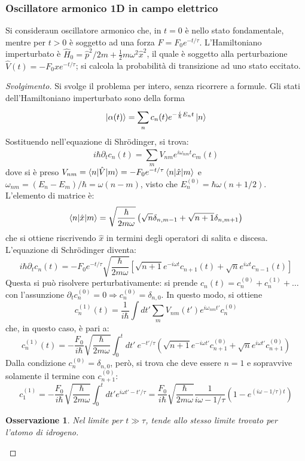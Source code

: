 \documentclass[11pt, a4paper]{scrartcl} %
\numberwithin{equation}{subsection}
\theoremstyle{style2}
\newtheorem{osservazione}{Osservazione}[section]
\theoremstyle{style1}
\renewcommand\qedsymbol{$\blacksquare$}
\newenvironment{svolgimento}{\renewcommand\qedsymbol{$\spadesuit$}\begin{proof}[Svolgimento]}{\end{proof}}
\begin{document}
\subsubsection{Oscillatore armonico 1D in campo elettrico}
Si consideraun oscillatore armonico che, in $t=0$ \`e nello stato fondamentale, mentre per $t > 0$ \`e soggetto ad una forza $F = F_0 e^{- t / \tau } $.
L'Hamiltoniano imperturbato \`e $\hat{H}_0 = \hat{p}^2 / 2m + \frac{1}{2}m \omega^2 \hat{x}^2$, il quale \`e soggetto alla perturbazione $\hat{V}(t) = - F_0 x e^{- t / \tau } $; si calcola la probabilit\`a di transizione ad uno stato eccitato.
\begin{svolgimento}
	Si svolge il problema per intero, senza ricorrere a formule.
	Gli stati dell'Hamiltoniano imperturbato sono della forma
	\[
	\ket{\alpha (t)} = \sum_{n}^{} c_n(t) e^{-\frac{i}{\hbar }E_n t} \ket{n} 
	\] 
	Sostituendo nell'equazione di Shr\"odinger, si trova:
	\[
	i \hbar \partial _t c_n(t) = \sum_{m}^{} V_{nm} e^{i \omega_{nm} t} c_m (t) 
	\] 
	dove si \`e preso $V_{nm} = \braket{n|\hat{V}|m} = - F_0 e^{- t / \tau } \braket{n|\hat{x}|m} $ e $\omega_{nm} = (E_n -E_m) / \hbar =\omega(n-m)$, visto che $E_n^{(0)} = \hbar \omega ( n + 1 /2)$.
L'elemento di matrice \`e:
\[
 \braket{n|\hat{x}|m} = \sqrt{\frac{\hbar }{2m\omega}} \left(\sqrt{n} \delta _{n,m-1} + \sqrt{n+1} \delta _{n,m+1} \right) 
\] 
che si ottiene riscrivendo $\hat{x} $ in termini degli operatori di salita e discesa.
L'equazione di Schr\"odinger diventa:
\begin{equation}
i \hbar  \partial _t c_n(t) = - F_0 e^{- t / \tau }  \sqrt{\frac{\hbar }{2m\omega}} \left[ \sqrt{n+1} e^{-i\omega t} c_{n+1} (t) + \sqrt{n} e^{i\omega t} c_{n-1} (t) \right] 
\end{equation}
Questa si pu\`o risolvere perturbativamente: si prende $c_n(t) = c_n^{(0)} + c_n^{(1)} + \ldots $  con l'assunzione $\partial _t c_n^{(0)} =0\Rightarrow c_n^{(0)} = \delta _{n,0} $.
In questo modo, si ottiene
\begin{equation}
	c_n^{(1)} (t) = \frac{1}{i\hbar } \int dt' \sum_{m}^{} V_{nm} (t') e^{i\omega_{nm} t'} c_n^{(0)} 
\end{equation}
che, in questo caso, \`e pari a:
\[
c^{(1)} _n (t) = -\frac{F_0}{i\hbar } \sqrt{\frac{\hbar }{2m\omega}} \int_{0} ^t dt' \ e^{- t' / \tau } \left(\sqrt{n+1} e^{-i\omega t'} c_{n+1} ^{(0)} + \sqrt{n} e^{i\omega t'} c_{n+1}^{(0)}  \right) 
\] 
Dalla condizione $c_n^{(0)} = \delta _{n,0} $, per\`o, si trova che deve essere $n=1$ e sopravvive solamente il termine con $c_{n+1} ^{(0)} $:
\begin{equation}
	c_1^{(1)} = - \frac{F_0}{i\hbar } \sqrt{\frac{\hbar }{2m\omega}} \int_{0} ^t dt ' e^{i\omega t' - t' / \tau } = \frac{F_0}{i\hbar }\sqrt{\frac{\hbar }{2m\omega}} \frac{1}{i\omega - 1 /\tau } \left(1- e^{(i\omega - 1 / \tau ) t} \right) 
\end{equation}
\begin{osservazione}
Nel limite per $t \gg \tau $, tende allo stesso limite trovato per l'atomo di idrogeno.
\end{osservazione}
\end{svolgimento}
\end{document}

